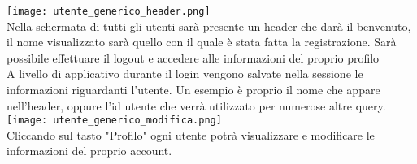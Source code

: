 \texttt{[image: utente\_generico\_header.png]}\\
Nella schermata di tutti gli utenti sarà presente un header che darà il benvenuto, il nome visualizzato sarà quello con il quale è stata fatta la registrazione. Sarà possibile effettuare il logout e accedere alle informazioni del proprio profilo \\
A livello di applicativo durante il login vengono salvate nella sessione le informazioni riguardanti l'utente. Un esempio è proprio il nome che appare nell'header, oppure l'id utente che verrà utilizzato per numerose altre query.\\
\texttt{[image: utente\_generico\_modifica.png]}\\
Cliccando sul tasto "Profilo" ogni utente potrà visualizzare e modificare le informazioni del proprio account.
